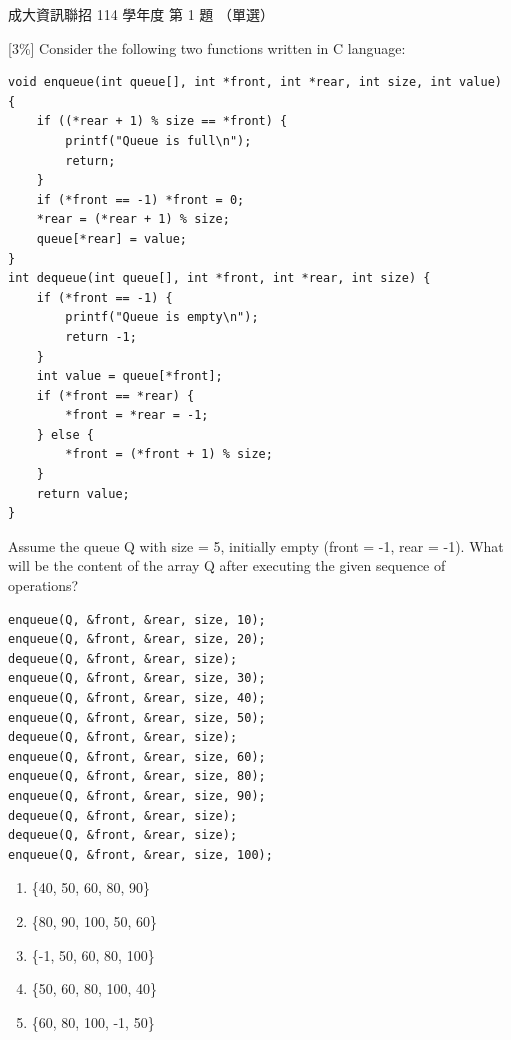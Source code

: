 \begin{pastexam}[label={px:ncku-114-prog-01}]{成大資訊聯招 114 學年度 第 1 題}
（單選）

{[3\%]} Consider the following two functions written in C language:
\begin{verbatim}
void enqueue(int queue[], int *front, int *rear, int size, int value) {
    if ((*rear + 1) % size == *front) {
        printf("Queue is full\n");
        return;
    }
    if (*front == -1) *front = 0;
    *rear = (*rear + 1) % size;
    queue[*rear] = value;
}
int dequeue(int queue[], int *front, int *rear, int size) {
    if (*front == -1) {
        printf("Queue is empty\n");
        return -1;
    }
    int value = queue[*front];
    if (*front == *rear) {
        *front = *rear = -1;
    } else {
        *front = (*front + 1) % size;
    }
    return value;
}
\end{verbatim}
Assume the queue Q with size = 5, initially empty (front = -1, rear = -1). What will be the content of the array Q after executing the given sequence of operations?
\begin{verbatim}
enqueue(Q, &front, &rear, size, 10);
enqueue(Q, &front, &rear, size, 20);
dequeue(Q, &front, &rear, size);
enqueue(Q, &front, &rear, size, 30);
enqueue(Q, &front, &rear, size, 40);
enqueue(Q, &front, &rear, size, 50);
dequeue(Q, &front, &rear, size);
enqueue(Q, &front, &rear, size, 60);
enqueue(Q, &front, &rear, size, 80);
enqueue(Q, &front, &rear, size, 90);
dequeue(Q, &front, &rear, size);
dequeue(Q, &front, &rear, size);
enqueue(Q, &front, &rear, size, 100);
\end{verbatim}
\begin{enumerate}[label=(\Alph*)]
\item \{40, 50, 60, 80, 90\}
\item \{80, 90, 100, 50, 60\}
\item \{-1, 50, 60, 80, 100\}
\item \{50, 60, 80, 100, 40\}
\item \{60, 80, 100, -1, 50\}
\end{enumerate}
\end{pastexam}

